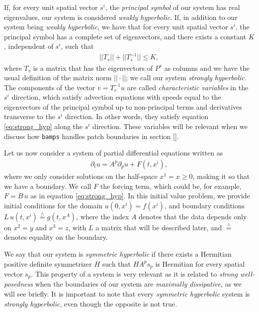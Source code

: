 If, for every unit spatial vector $s^i$, the \textit{principal symbol} of our system has real eigenvalues, our system is considered \textit{weakly hyperbolic}. If, in addition to our system being \textit{weakly hyperbolic}, we have that for every unit spatial vector $s^i$, the principal symbol has a complete set of eigenvectors, and there exists a constant $K$, independent of $s^i$, such that
%
\begin{align}
    ||T_s|| + ||T_s^{-1}|| \leq K,
\end{align}
%
where $T_s$ is a matrix that has the eigenvectors of $P^s$ as columns and we have the usual definition of the matrix norm $||\cdot||$; we call our system \textit{strongly hyperbolic}. The components of the vector $v = T^{-1}_s u$ are called \textit{characteristic variables} in the $s^i$ direction, which satisfy advection equations with speeds equal to the eigenvectors of the principal symbol up to non-principal terms and derivatives transverse to the $s^i$ direction. In other words, they satisfy equation \eqref{eq:strong_hyp} along the $s^i$ direction. These variables will be relevant when we discuss how \texttt{bamps} handles patch boundaries in section \ref{}.


Let us now consider a system of partial differential equations written as
\begin{align}
    \partial_t u = A^p \partial_p u + F(t,x^i),
\end{align}
%
where we only consider solutions on the half-space $x^1 = x\geq 0$, making it so that we have a boundary. We call $F$ the forcing term, which could be, for example, $F = B \, u$ as in equation \eqref{eq:strong_hyp}. In this initial value problem, we provide initial conditions for the domain $u(0,x^i)=f(x^i)$, and boundary conditions $L\, u(t,x^i) \stackrel{\wedge}{=} g(t,x^A)$, where the index $A$ denotes that the data depends only on $x^2 = y$ and $x^3=z$, with $L$ a matrix that will be described later, and $\stackrel{\wedge}{=}$ denotes equality on the boundary.

We say that our system is \textit{symmetric hyperbolic} if there exists a Hermitian positive definite symmetrizer $H$ such that $H A^p s_p$ is Hermitian for every spatial vector $s_p$. This property of a system is very relevant as it is related to \textit{strong well-posedness} when the boundaries of our system are \textit{maximally dissipative}, as we will see briefly. It is important to note that every \textit{symmetric hyperbolic} system is \textit{strongly hyperbolic}, even though the opposite is not true.

